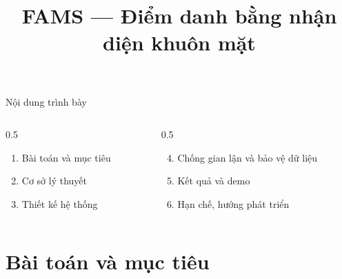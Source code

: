 \documentclass[aspectratio=169, 11pt]{beamer}
\title{FAMS — Điểm danh bằng nhận diện khuôn mặt}
\author{\sdTenSinhVien}
\date{\sdDiaDiemNgay}
\begin{document}

\begin{frame}{Nội dung trình bày}
  \begin{columns}[T]
    \begin{column}{0.5\textwidth}
      \begin{enumerate}
        \item Bài toán và mục tiêu
        \item Cơ sở lý thuyết
        \item Thiết kế hệ thống
      \end{enumerate}
    \end{column}
    \begin{column}{0.5\textwidth}
      \begin{enumerate}
        \setcounter{enumi}{3}
        \item Chống gian lận và bảo vệ dữ liệu
        \item Kết quả và demo
        \item Hạn chế, hướng phát triển
      \end{enumerate}
    \end{column}
  \end{columns}
  \vfill
  \begin{center}
     \hfill
     \hfill
  \end{center}
\end{frame}

\section{Bài toán và mục tiêu}
\end{document}
